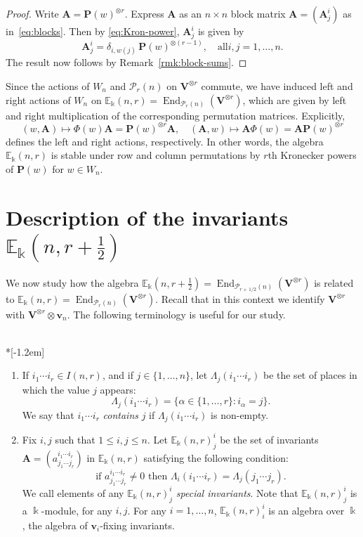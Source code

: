 \documentclass[ALCO,ThmDefs,Unicode,epreuves]{cedram}
\DeclareMathOperator{\End}{End}
\newcommand{\E}{\mathbb{E}}
\newcommand{\Ptn}{\mathcal{P}}
\newcommand{\bA}{\mathbf{A}}
\newcommand{\bP}{\mathbf{P}}
\newcommand{\V}{\mathbf{V}} %
\newcommand{\bv}{\mathbf{v}} %
\newcommand{\half}{\, 1/2} %
\newcommand{\fhalf}{\frac{1}{2}} %
\begin{document}
\begin{proof}
Write $\bA = \bP(w)^{\otimes r}$. Express $\bA$ as an $n \times n$
block matrix $\bA = (\bA^i_j)$ as in~\eqref{eq:blocks}. Then by
\eqref{eq:Kron-power}, $\bA^i_j$ is given by
\[
\bA^i_j = \delta_{i, w(j)} \, \bP(w)^{\otimes (r-1)}, \quad \text{all
} i,j = 1, \dots, n.
\]
The result now follows by Remark~\ref{rmk:block-sums}. 
\end{proof}

Since the actions of $W_n$ and $\Ptn_r(n)$ on $\V^{\otimes r}$
commute, we have induced left and right actions of $W_n$ on
$\E_\Bbbk(n,r) = \End_{\Ptn_r(n)}(\V^{\otimes r})$, which are given by
left and right multiplication of the corresponding permutation
matrices. Explicitly,
\begin{equation}\label{eq:W_n-actions}
 (w, \bA) \mapsto \Phi(w) \bA = \bP(w)^{\otimes r} \bA, \quad
 (\bA,w) \mapsto \bA \Phi(w) = \bA \bP(w)^{\otimes r} 
\end{equation}
defines the left and right actions, respectively. In other words, the
algebra $\E_\Bbbk(n,r)$ is stable under row and column permutations by
$r$th Kronecker powers of $\bP(w)$ for $w \in W_n$. 


\section{Description of the invariants \texorpdfstring{$\E_\Bbbk(n,r+\fhalf)$}{Ek (n,r+1/2)}}%
\label{sec:special}%
We now study how the algebra $\E_\Bbbk(n,r+\fhalf)
= \End_{\Ptn_{r+\half}(n)}(\V^{\otimes r})$ is related to
$\E_\Bbbk(n,r) = \End_{\Ptn_r(n)}(\V^{\otimes r})$. Recall that in
this context we identify $\V^{\otimes r}$ with $\V^{\otimes r}
\otimes \bv_n$. The following terminology is useful for our study.

\begin{defi}\label{def:special}\ \\*[-1.2em]
\begin{enumerate}[label=(\alph*)] 
\item \label{defi4.1_i}
If $i_1 \cdots i_r \in I(n,r)$, and if $j \in \{1, \dots, n\}$,
let $\Lambda_j(i_1 \cdots i_r)$ be the set of places in which the
value $j$ appears:
\[
\Lambda_j(i_1 \cdots i_r) = \{ \alpha \in \{1, \dots, r\} : i_\alpha =
j \}.
\]
We say that $i_1\cdots i_r$ \emph{contains} $j$ if $\Lambda_j(i_1
\cdots i_r)$ is non-empty.


\item \label{defi4.1_ii}
 Fix $i,j$ such that $1 \le i,j \le n$. Let $\E_\Bbbk(n,r)^i_j$ be
the set of invariants $\bA = (a^{i_1 \cdots i_r}_{j_1 \cdots j_r})$ in
$\E_\Bbbk(n,r)$ satisfying the following condition:
\[
\text{if $a^{i_1 \cdots i_r}_{j_1 \cdots j_r} \ne 0$ then
 $\Lambda_i(i_1 \cdots i_r) = \Lambda_j(j_1 \cdots j_r)$.}
\]
We call elements of any $\E_\Bbbk(n,r)^i_j$ \emph{special
 invariants}. Note that $\E_\Bbbk(n,r)^i_j$ is a $\Bbbk$-module, for
any $i,j$. For any $i = 1, \dots, n$, $\E_\Bbbk(n,r)^i_i$ is an
algebra over $\Bbbk$, the algebra of $\bv_i$-fixing invariants.
\end{enumerate}
\end{defi}
\end{document}
